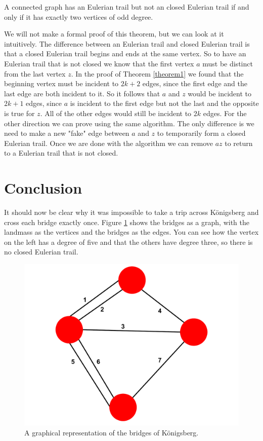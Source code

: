 \documentclass[10pt]{amsart}
\begin{document}
\begin{theorem} \label{theorem2}
    A connected graph has an Eulerian trail but not an closed Eulerian trail if and only if it has
    exactly two vertices of odd degree.
\end{theorem}


We will not make a formal proof of this theorem, but we can look at it intuitively. The difference
between an Eulerian trail and closed Eulerian trail is that a closed Eulerian trail begins and ends
at the same vertex. So to have an Eulerian trail that is not closed we know that the first vertex $a$
must be distinct from the last vertex $z$. In the proof of Theorem \ref{theorem1} we found that the
beginning vertex must be incident to $2k+2$ edges, since the first edge and the last edge are both
incident to it. So it follows that $a$ and $z$ would be incident to $2k+1$ edges, since $a$ is incident
to the first edge but not the last and the opposite is true for $z$. All of the other edges would still
be incident to $2k$ edges. For the other direction we can prove using the same algorithm. The only
difference is we need to make a new "fake" edge between $a$ and $z$ to temporarily form a closed
Eulerian trail. Once we are done with the algorithm we can remove $az$ to return to a Eulerian trail
that is not closed.

\section{Conclusion}

It should now be clear why it was impossible to take a trip across K\"{o}nigsberg and cross each bridge
exactly once. Figure \ref{g_bridge} shows the bridges as a graph, with the landmass as the vertices and the 
bridges as the edges. You can see how the vertex on the left has a degree of five and that the others
have degree three, so there is no closed Eulerian trail.

\begin{figure}[h!]
    \centerline{
    {\includegraphics[width=.5\textwidth]{pictures/konigsberg.pdf}}}
    \caption{A graphical representation of the bridges of K\"{o}nigsberg.}\label{g_bridge}
\end{figure} 
\end{document}
